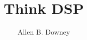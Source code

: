\documentclass[12pt]{book}
\title{Think DSP}
\author{Allen B. Downey}
\newif\ifplastex
\begin{document}
\frontmatter



\ifplastex
    \usepackage{localdef}
    \maketitle

\newcount\anchorcnt
\newcommand*{\Anchor}[1]{%
  \@bsphack%
    \Hy@GlobalStepCount\anchorcnt%
    \edef\@currentHref{anchor.\the\anchorcnt}%
    \Hy@raisedlink{\hyper@anchorstart{\@currentHref}\hyper@anchorend}%
    \M@gettitle{}\label{#1}%
    \@esphack%
}
\else

  {\topsep}%
  {\topsep}%
  {}%
  {}%
  {\bfseries}%
  {}%
  { }%
  {}%

\theoremstyle{exercise}
\newtheorem{exercise}{Exercise}[chapter]


\end{document}
